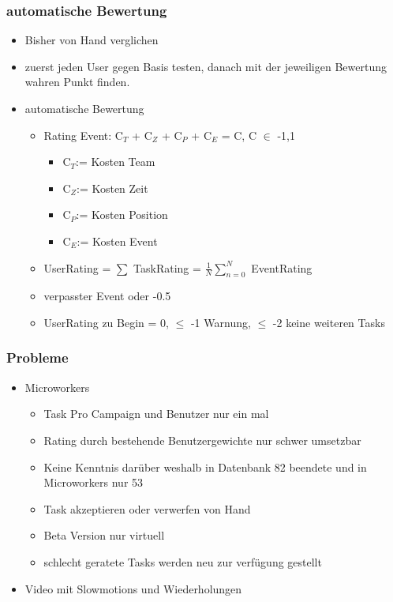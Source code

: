 \documentclass[]{beamer}
\begin{document}
\begin{frame}
	\frametitle{automatische Bewertung}
	\begin{itemize}
		\item Bisher von Hand verglichen
		\item zuerst jeden User gegen Basis testen, danach mit der jeweiligen Bewertung wahren Punkt finden.
		\item automatische Bewertung
		\begin{itemize}
			\item Rating Event: C$_{T}$ + C$_{Z}$ + C$_{P}$ + C$_{E}$ = C, C $\in$ {-1,1}
			\begin{itemize}
				\item C$_{T}$:= Kosten Team
				\item C$_{Z}$:= Kosten Zeit
				\item C$_{P}$:= Kosten Position
				\item C$_{E}$:= Kosten Event
			\end{itemize}
			\item UserRating = $\sum$ TaskRating = $ \frac{1}{N} \sum\limits_{n=0}^N$ EventRating
			\item verpasster Event oder -0.5
			\item UserRating zu Begin = 0, $\le$ -1 Warnung, $\le$ -2 keine weiteren Tasks
		\end{itemize}
	\end{itemize}
\end{frame}

\begin{frame}
	\frametitle{Probleme}
	\begin{itemize}
		\item Microworkers
		\begin{itemize}
			\item Task Pro Campaign und Benutzer nur ein mal
			\item Rating durch bestehende Benutzergewichte nur schwer umsetzbar
			\item Keine Kenntnis darüber weshalb in Datenbank 82 beendete und in Microworkers nur 53
			\item Task akzeptieren oder verwerfen von Hand
			\item Beta Version nur virtuell
			\item schlecht geratete Tasks werden neu zur verfügung gestellt
		\end{itemize}
		\item Video mit Slowmotions und Wiederholungen
	\end{itemize}
\end{frame}
\end{document}
